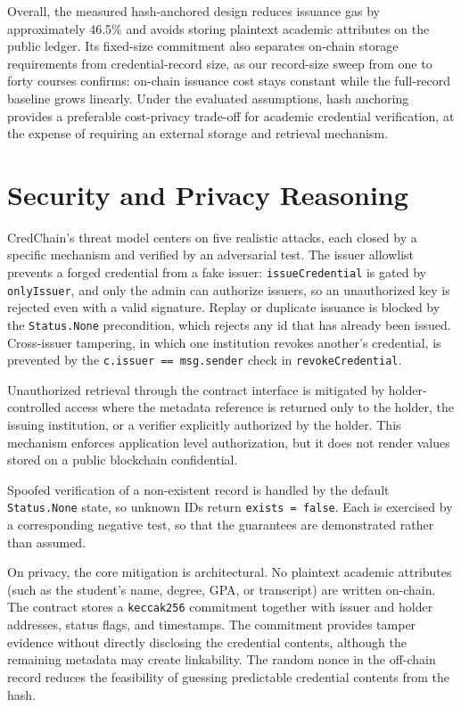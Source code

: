 \documentclass[conference]{IEEEtran}
\begin{document}
Overall, the measured hash-anchored design reduces issuance gas by approximately 46.5\% and avoids storing plaintext academic attributes on the public ledger. Its fixed-size commitment also separates on-chain storage requirements from credential-record size, as our record-size sweep from one to forty courses confirms: on-chain issuance cost stays constant while the full-record baseline grows linearly. Under the evaluated assumptions, hash anchoring provides a preferable cost-privacy trade-off for academic credential verification, at the expense of requiring an external storage and retrieval mechanism.

\section{Security and Privacy Reasoning}
\label{sec:security}
CredChain's threat model centers on five realistic attacks, each closed by a specific mechanism and verified by an adversarial test. The issuer allowlist prevents a forged credential from a fake issuer: \texttt{issueCredential} is gated by \texttt{onlyIssuer}, and only the admin can authorize issuers, so an unauthorized key is rejected even with a valid signature. Replay or duplicate issuance is blocked by the \texttt{Status.None} precondition, which rejects any id that has already been issued. Cross-issuer tampering, in which one institution revokes another's credential, is prevented by the \texttt{c.issuer == msg.sender} check in \texttt{revokeCredential}.

Unauthorized retrieval through the contract interface is mitigated by holder-controlled access where the metadata reference is returned only to the holder, the issuing institution, or a verifier explicitly authorized by the holder. This mechanism enforces application level authorization, but it does not render values stored on a public blockchain confidential.

Spoofed verification of a non-existent record is handled by the default \texttt{Status.None} state, so unknown IDs return \texttt{exists = false}. Each is exercised by a corresponding negative test, so that the guarantees are demonstrated rather than assumed.

On privacy, the core mitigation is architectural. No plaintext academic attributes (such as the student's name, degree, GPA, or transcript) are written on-chain. The contract stores a \verb|keccak256| commitment together with issuer and holder addresses, status flags, and timestamps. The commitment provides tamper evidence without directly disclosing the credential contents, although the remaining metadata may create linkability. The random nonce in the off-chain record reduces the feasibility of guessing predictable credential contents from the hash.
\end{document}
